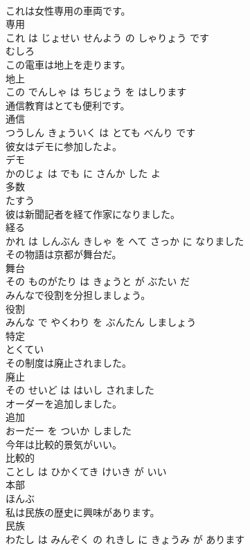 \documentclass[8pt]{extreport}
\begin{document}
\begin{CJK}{UTF8}{min}
\\	これは女性専用の車両です。	
\\	専用 
\\	これ は じょせい せんよう の しゃりょう です			
\\	むしろ	
\\	この電車は地上を走ります。	
\\	地上 
\\	この でんしゃ は ちじょう を はしります			
\\	通信教育はとても便利です。	
\\	通信 
\\	つうしん きょういく は とても べんり です			
\\	彼女はデモに参加したよ。	
\\	デモ 
\\	かのじょ は でも に さんか した よ			
\\	多数	
\\	たすう			
\\	彼は新聞記者を経て作家になりました。	
\\	経る 
\\	かれ は しんぶん きしゃ を へて さっか に なりました			
\\	その物語は京都が舞台だ。	
\\	舞台 
\\	その ものがたり は きょうと が ぶたい だ			
\\	みんなで役割を分担しましょう。	
\\	役割 
\\	みんな で やくわり を ぶんたん しましょう			
\\	特定	
\\	とくてい			
\\	その制度は廃止されました。	
\\	廃止 
\\	その せいど は はいし されました			
\\	オーダーを追加しました。	
\\	追加 
\\	おーだー を ついか しました			
\\	今年は比較的景気がいい。	
\\	比較的 
\\	ことし は ひかくてき けいき が いい			
\\	本部	
\\	ほんぶ			
\\	私は民族の歴史に興味があります。	
\\	民族 
\\	わたし は みんぞく の れきし に きょうみ が あります			

\end{CJK}
\end{document}
